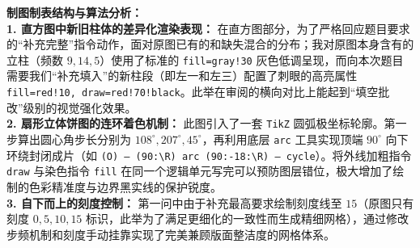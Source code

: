 \documentclass[12pt, a4paper]{ctexrep}
\begin{document}
\vspace{0.4cm}
\begin{center}
\end{center}

\vspace{0.6cm}

{\small\color{blue!70!black}
\textbf{制图制表结构与算法分析：}\\
\textbf{1. 直方图中新旧柱体的差异化渲染表现：} 在直方图部分，为了严格回应题目要求的“补充完整”指令动作，面对原图已有的和缺失混合的分布；我对原图本身含有的立柱（频数 $9, 14, 5$）使用了标准的 \texttt{fill=gray!30} 灰色低调呈现，而向本次题目需要我们“补充填入”的新柱段（即左一和左三）配置了刺眼的高亮属性 \texttt{fill=red!10, draw=red!70!black}。此举在审阅的横向对比上能起到“填空批改”级别的视觉强化效果。\\
\textbf{2. 扇形立体饼图的连环着色机制：} 此图引入了一套 \texttt{TikZ} 圆弧极坐标轮廓。第一步算出圆心角步长分别为 $108^\circ, 207^\circ, 45^\circ$，再利用底层 \texttt{arc} 工具实现顶端 $90^\circ$ 向下环绕封闭成片（如 \texttt{(O) -- (90:\textbackslash R) arc (90:-18:\textbackslash R) -- cycle}）。将外线加粗指令 \texttt{draw} 与染色指令 \texttt{fill} 在同一个逻辑单元写完可以预防图层错位，极大增加了绘制的色彩精准度与边界黑实线的保护锐度。\\
\textbf{3. 自下而上的刻度控制：} 第一问中由于补充最高要求绘制刻度线至 $15$（原图只有刻度 $0,5,10,15$ 标识，此举为了满足更细化的一致性而生成精细网格），通过修改步频机制和刻度手动挂靠实现了完美兼顾版面整洁度的网格体系。
}
\end{document}

